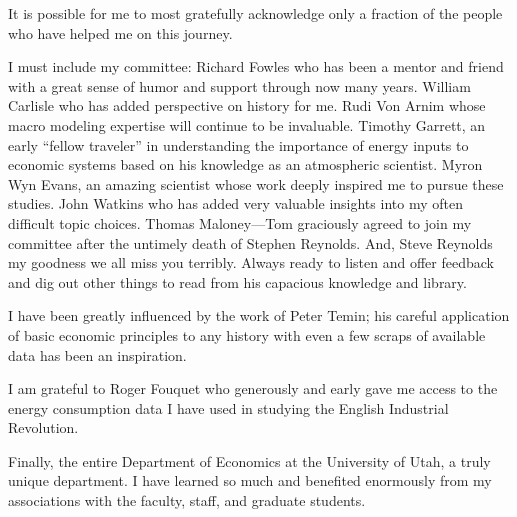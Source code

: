 \iffalse
{\footnotesize\em This page is optional.
It's in the table of contents and it's labeled 'ACKNOWLEDGMENTS' even
though the spelling `ACKNOWLEDGEMENTS' is also correct.
This page should be at the end of the preface, if one exists, or a
separate page, if no preface is used.}
\fi

\iffalse
Recognize faculty, friends, family but not the typist, editor or persons
paid to produce the manuscript from draft copy. Recognize funding,
special permission to reproduce figures and copyrighted material.
\fi

	It is possible for me to most gratefully acknowledge only a fraction of the people who have helped me on this journey.
	
	I must include my committee: Richard Fowles who has been a mentor and friend with a great sense of humor and support through now many years. William Carlisle who has added perspective on history for me. Rudi Von Arnim whose macro modeling expertise will continue to be invaluable. Timothy Garrett, an early ``fellow traveler'' in understanding the importance of energy inputs to economic systems based on his knowledge as an atmospheric scientist. Myron Wyn Evans, an amazing scientist whose work deeply inspired me to pursue these studies. John Watkins who has added very valuable insights into my often difficult topic choices. Thomas Maloney---Tom graciously agreed to join my committee after the untimely death of Stephen Reynolds. And, Steve Reynolds my goodness we all miss you terribly. Always ready to listen and offer feedback and dig out other things to read from his capacious knowledge and library.
	
	I have been greatly influenced by the work of Peter Temin; his careful application of basic economic principles to any history with even a few scraps of available data has been an inspiration.
	
	I am grateful to Roger Fouquet who generously and early gave me access to the energy consumption data I have used in studying the English Industrial Revolution.
	
	Finally, the entire Department of Economics at the University of Utah, a truly unique department. I have learned so much and benefited enormously from my associations with the faculty, staff, and graduate students.